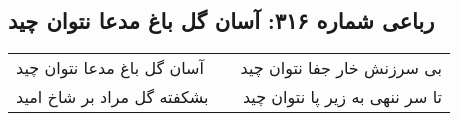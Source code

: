 \begin{center}
\section*{رباعی شماره ۳۱۶: آسان گل باغ مدعا نتوان چید}
\label{sec:sh316}
\begin{longtable}{l p{0.5cm} r}
آسان گل باغ مدعا نتوان چید
&&
بی سرزنش خار جفا نتوان چید
\\
بشکفته گل مراد بر شاخ امید
&&
تا سر ننهی به زیر پا نتوان چید
\\
\end{longtable}
\end{center}
